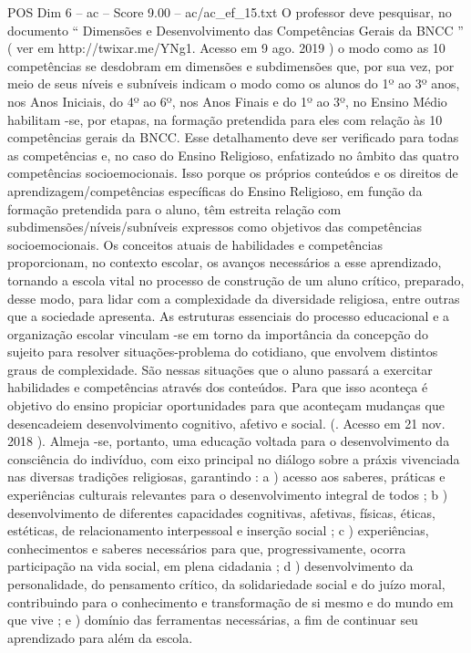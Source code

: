 \begin{textsample}{POS Dim 6 – ac – Score 9.00 – ac/ac\_ef\_15.txt}
O professor deve pesquisar, no documento “ Dimensões e Desenvolvimento das Competências Gerais da BNCC ” ( ver em http://twixar.me/YNg1.
Acesso em 9 ago. 2019 ) o modo como as 10 competências se desdobram em dimensões e subdimensões que, por sua vez, por meio de seus níveis e subníveis indicam o modo como os alunos do 1º ao 3º anos, nos Anos Iniciais, do 4º ao 6º, nos Anos Finais e do 1º ao 3º, no Ensino Médio habilitam -se, por etapas, na formação pretendida para eles com relação às 10 competências gerais da BNCC.
Esse detalhamento deve ser verificado para todas as competências e, no caso do Ensino Religioso, enfatizado no âmbito das quatro competências socioemocionais.
Isso porque os próprios conteúdos e os direitos de aprendizagem/competências específicas do Ensino Religioso, em função da formação pretendida para o aluno, têm estreita relação com subdimensões/níveis/subníveis expressos como objetivos das competências socioemocionais.
Os conceitos atuais de habilidades e competências proporcionam, no contexto escolar, os avanços necessários a esse aprendizado, tornando a escola vital no processo de construção de um aluno crítico, preparado, desse modo, para lidar com a complexidade da diversidade religiosa, entre outras que a sociedade apresenta.
As estruturas essenciais do processo educacional e a organização escolar vinculam -se em torno da importância da concepção do sujeito para resolver situações-problema do cotidiano, que envolvem distintos graus de complexidade.
São nessas situações que o aluno passará a exercitar habilidades e competências através dos conteúdos.
Para que isso aconteça é objetivo do ensino propiciar oportunidades para que aconteçam mudanças que desencadeiem desenvolvimento cognitivo, afetivo e social. (.
Acesso em 21 nov. 2018 ).
Almeja -se, portanto, uma educação voltada para o desenvolvimento da consciência do indivíduo, com eixo principal no diálogo sobre a práxis vivenciada nas diversas tradições religiosas, garantindo : a ) acesso aos saberes, práticas e experiências culturais relevantes para o desenvolvimento integral de todos ; b ) desenvolvimento de diferentes capacidades cognitivas, afetivas, físicas, éticas, estéticas, de relacionamento interpessoal e inserção social ; c ) experiências, conhecimentos e saberes necessários para que, progressivamente, ocorra participação na vida social, em plena cidadania ; d ) desenvolvimento da personalidade, do pensamento crítico, da solidariedade social e do juízo moral, contribuindo para o conhecimento e transformação de si mesmo e do mundo em que vive ; e ) domínio das ferramentas necessárias, a fim de continuar seu aprendizado para além da escola.

\end{textsample}
